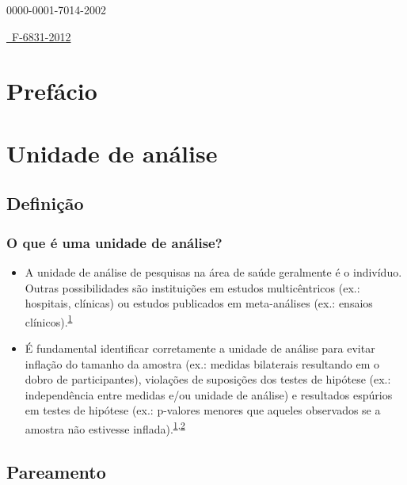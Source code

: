 \documentclass[
]{book}
\begin{document}
0000-0001-7014-2002

\href{https://publons.com/researcher/F-6831-2012}{~F-6831-2012}

\hypertarget{prefuxe1cio}{%
\chapter*{Prefácio}\label{prefuxe1cio}}

\hypertarget{unidade-analise}{%
\chapter{\texorpdfstring{\textbf{Unidade de análise}}{Unidade de análise}}\label{unidade-analise}}

\hypertarget{definicao}{%
\section{Definição}\label{definicao}}

\hypertarget{o-que-uxe9-uma-unidade-de-anuxe1lise}{%
\subsection{O que é uma unidade de análise?}\label{o-que-uxe9-uma-unidade-de-anuxe1lise}}

\begin{itemize}
\item
  A unidade de análise de pesquisas na área de saúde geralmente é o indivíduo. Outras possibilidades são instituições em estudos multicêntricos (ex.: hospitais, clínicas) ou estudos publicados em meta-análises (ex.: ensaios clínicos).\textsuperscript{\protect\hyperlink{ref-Altman1997}{1}}
\item
  É fundamental identificar corretamente a unidade de análise para evitar inflação do tamanho da amostra (ex.: medidas bilaterais resultando em o dobro de participantes), violações de suposições dos testes de hipótese (ex.: independência entre medidas e/ou unidade de análise) e resultados espúrios em testes de hipótese (ex.: p-valores menores que aqueles observados se a amostra não estivesse inflada).\textsuperscript{\protect\hyperlink{ref-Altman1997}{1},\protect\hyperlink{ref-Matthews1990}{2}}
\end{itemize}

\hypertarget{pareamento}{%
\section{Pareamento}\label{pareamento}}
\end{document}
